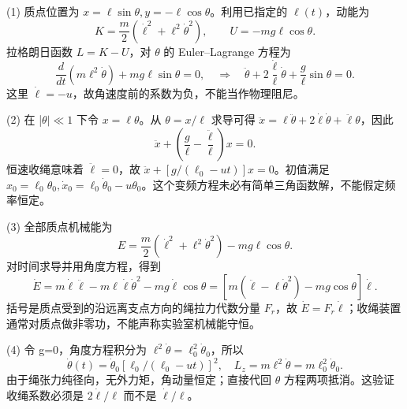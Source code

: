 (1) 质点位置为 \(x=\ell\sin\theta,y=-\ell\cos\theta\)。利用已指定的 \(\ell (t)\)，动能为
\[
K=\frac m2(\dot\ell^2+\ell^2\dot\theta^2),\qquad U=-mg\ell\cos\theta .
\]
拉格朗日函数 \(L=K-U\)，对 \(\theta \) 的 Euler–Lagrange 方程为
\[
\frac d{dt}(m\ell^2\dot\theta)+mg\ell\sin\theta=0,
\quad\Longrightarrow\quad
\ddot\theta+2\frac{\dot\ell}{\ell}\dot\theta+\frac g\ell\sin\theta=0.
\]
这里 \(\dot\ell=-u\)，故角速度前的系数为负，不能当作物理阻尼。

(2) 在 |\(\theta|\ll1\) 下令 \(x=\ell\theta\)。从 \(\theta=x/\ell\) 求导可得 \(\ddot x=\ell\ddot\theta+2\dot\ell\dot\theta+\ddot\ell\theta\)，因此
\[
\ddot x+\left(\frac g\ell-\frac{\ddot\ell}{\ell}\right)x=0.
\]
恒速收绳意味着 \(\ddot\ell=0\)，故 \(\ddot x+[g/(\ell_0-ut)]x=0\)。初值满足 \(x_0=\ell_0\theta_0,\dot x_0=\ell_0\dot\theta_0-u\theta_0\)。这个变频方程未必有简单三角函数解，不能假定频率恒定。

(3) 全部质点机械能为
\[
E=\frac m2(\dot\ell^2+\ell^2\dot\theta^2)-mg\ell\cos\theta .
\]
对时间求导并用角度方程，得到
\[
\dot E=m\dot\ell\ddot\ell-m\ell\dot\ell\dot\theta^2-mg\dot\ell\cos\theta
=[m(\ddot\ell-\ell\dot\theta^2)-mg\cos\theta]\dot\ell .
\]
括号是质点受到的沿远离支点方向的绳拉力代数分量 \(F_r\)，故 \(\dot E=F_r\dot\ell\)；收绳装置通常对质点做非零功，不能声称实验室机械能守恒。

(4) 令 g=0，角度方程积分为 \(\ell^2\dot\theta=\ell_0^2\dot\theta_0\)，所以
\[
\dot\theta(t)=\dot\theta_0[\ell_0/(\ell_0-ut)]^2,\quad
L_z=m\ell^2\dot\theta=m\ell_0^2\dot\theta_0.
\]
由于绳张力纯径向，无外力矩，角动量恒定；直接代回 \(\theta \) 方程两项抵消。这验证收绳系数必须是 \(2\dot\ell/\ell\) 而不是 \(\dot\ell/\ell\)。
